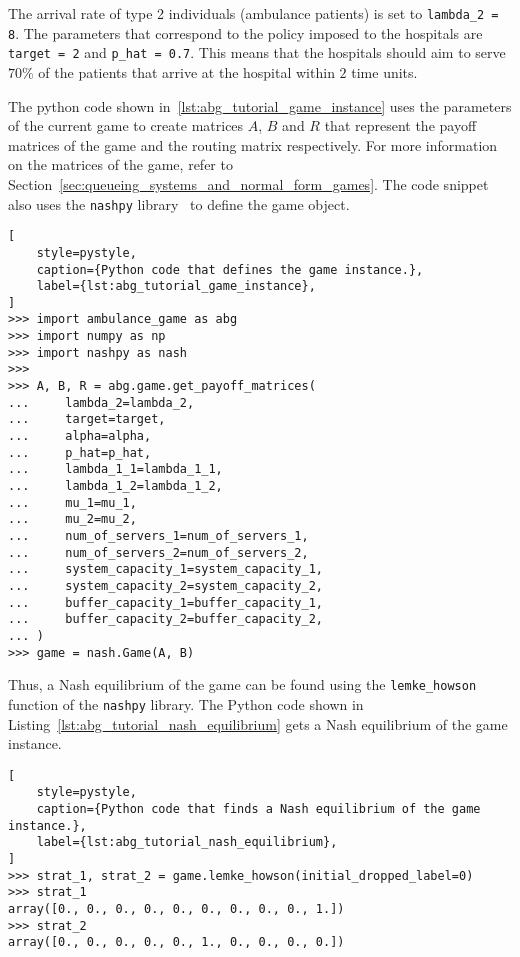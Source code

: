 The arrival rate of type 2 individuals (ambulance patients) is set to
\texttt{lambda\_2 = 8}.
The parameters that correspond to the policy imposed to the hospitals are
\texttt{target = 2} and \texttt{p\_hat = 0.7}.
This means that the hospitals should aim to serve \(70\%\) of the patients
that arrive at the hospital within \(2\) time units.

The python code shown in~\ref{lst:abg_tutorial_game_instance} uses the
parameters of the current game to create matrices \(A\), \(B\) and \(R\)
that represent the payoff matrices of the game and the routing matrix
respectively.
For more information on the matrices of the game, refer to
Section~\ref{sec:queueing_systems_and_normal_form_games}.
The code snippet also uses the \texttt{nashpy} library~\cite{nashpy} to
define the game object.

\begin{lstlisting}[
    style=pystyle,
    caption={Python code that defines the game instance.},
    label={lst:abg_tutorial_game_instance},
]
>>> import ambulance_game as abg
>>> import numpy as np
>>> import nashpy as nash
>>>
>>> A, B, R = abg.game.get_payoff_matrices(
...     lambda_2=lambda_2,
...     target=target,
...     alpha=alpha,
...     p_hat=p_hat,
...     lambda_1_1=lambda_1_1,
...     lambda_1_2=lambda_1_2,
...     mu_1=mu_1,
...     mu_2=mu_2,
...     num_of_servers_1=num_of_servers_1,
...     num_of_servers_2=num_of_servers_2,
...     system_capacity_1=system_capacity_1,
...     system_capacity_2=system_capacity_2,
...     buffer_capacity_1=buffer_capacity_1,
...     buffer_capacity_2=buffer_capacity_2,
... )
>>> game = nash.Game(A, B)

\end{lstlisting}

Thus, a Nash equilibrium of the game can be found using the
\texttt{lemke\_howson} function of the \texttt{nashpy} library.
The Python code shown in Listing~\ref{lst:abg_tutorial_nash_equilibrium}
gets a Nash equilibrium of the game instance.

\begin{lstlisting}[
    style=pystyle,
    caption={Python code that finds a Nash equilibrium of the game instance.},
    label={lst:abg_tutorial_nash_equilibrium},
]
>>> strat_1, strat_2 = game.lemke_howson(initial_dropped_label=0)
>>> strat_1
array([0., 0., 0., 0., 0., 0., 0., 0., 0., 1.])
>>> strat_2
array([0., 0., 0., 0., 0., 1., 0., 0., 0., 0.])

\end{lstlisting}

